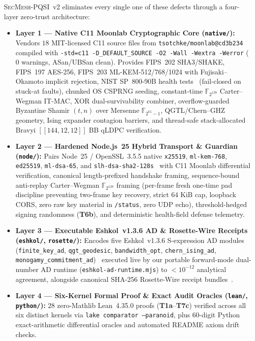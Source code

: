 \documentclass[11pt,reqno]{amsart}
\newcommand{\F}{\mathbb{F}}
\newcommand{\code}[1]{\texttt{\small #1}}
\begin{document}
\textsc{SecMesh-PQSI}~v2 eliminates every single one of these defects through a four-layer zero-trust architecture:
\begin{itemize}[leftmargin=1.6em]
  \item \textbf{Layer 1 — Native C11 Moonlab Cryptographic Core (\code{native/}):} Vendors $18$ MIT-licensed C11 source files from \code{tsotchke/moonlab@cd3b234}~\cite{tsotchke_moonlab} compiled with \code{-std=c11 -D\_DEFAULT\_SOURCE -O2 -Wall -Wextra -Werror} ($0$ warnings, ASan/UBSan clean). Provides FIPS~202 SHA3/SHAKE, FIPS~197 AES-256, FIPS~203 ML-KEM-512/768/1024 with Fujisaki--Okamoto implicit rejection, NIST SP~800-90B health tests~\cite{nist_sp800_90b} (fail-closed on stuck-at faults), chunked OS CSPRNG seeding, constant-time $\F_{2^{128}}$ Carter--Wegman IT-MAC, XOR dual-survivability combiner, overflow-guarded Byzantine Shamir $(t,n)$ over Mersenne $\F_{2^{61}-1}$, QGTL/Chern--GHZ geometry, Ising expander contagion barriers, and thread-safe stack-allocated Bravyi $[[144,12,12]]$ BB qLDPC verification.
  \item \textbf{Layer 2 — Hardened Node.js~25 Hybrid Transport \& Guardian (\code{node/}):} Pairs Node~25 / OpenSSL~3.5.5 native \code{x25519}, \code{ml-kem-768}, \code{ed25519}, \code{ml-dsa-65}, and \code{slh-dsa-sha2-128s}~\cite{nist_fips203,nist_fips204,nist_fips205} with C11 Moonlab differential verification, canonical length-prefixed handshake framing, sequence-bound anti-replay Carter--Wegman $\F_{2^{128}}$ framing (per-frame fresh one-time pad discipline preventing two-frame key recovery, strict $64\text{ KiB}$ cap, loopback CORS, zero raw key material in \code{/status}, zero UDP echo), threshold-hedged signing randomness (\textbf{T6b}), and deterministic health-field defense telemetry.
  \item \textbf{Layer 3 — Executable Eshkol~v1.3.6 AD \& Rosette-Wire Receipts (\code{eshkol/}, \code{rosette/}):} Encodes five Eshkol~v1.3.6 S-expression AD modules (\code{finite\_key\_ad}, \code{qgt\_geodesic}, \code{bandwidth\_opt}, \code{chern\_ising\_ad}, \code{monogamy\_commitment\_ad})~\cite{tsotchke_eshkol} executed live by our portable forward-mode dual-number AD runtime (\code{eshkol-ad-runtime.mjs}) to $<10^{-12}$ analytical agreement, alongside canonical SHA-256 Rosette-Wire receipt bundles~\cite{tsotchke_rosette}.
  \item \textbf{Layer 4 — Six-Kernel Formal Proof \& Exact Audit Oracles (\code{lean/}, \code{python/}):} $28$ zero-Mathlib Lean~4.35.0 proofs (\textbf{T1a}--\textbf{T7c}) verified across all six distinct kernels via \code{lake comparator --paranoid}, plus $60$-digit Python exact-arithmetic differential oracles and automated README axiom drift checks.
\end{itemize}
\end{document}
